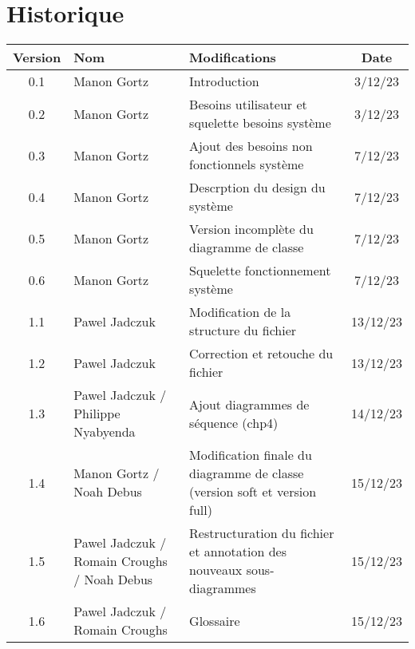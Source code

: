 \documentclass[../introduction.tex]{subfiles}
\begin{document}
\section{Historique}
\begin{tabular}{|c|p{4cm}|p{6cm}|c|}
    \hline  
    Version & Nom & Modifications & Date\\  
    \hline 
    0.1 & Manon Gortz & Introduction & 3/12/23 \\   
    0.2 & Manon Gortz & Besoins utilisateur et squelette besoins système & 3/12/23 \\ 
    0.3 & Manon Gortz & Ajout des besoins non fonctionnels système & 7/12/23 \\
    0.4 & Manon Gortz & Descrption du design du système & 7/12/23 \\
    0.5 & Manon Gortz & Version incomplète du diagramme de classe & 7/12/23 \\
    0.6 & Manon Gortz & Squelette fonctionnement système & 7/12/23 \\
    1.1 & Pawel Jadczuk & Modification de la structure du fichier & 13/12/23 \\
    1.2 & Pawel Jadczuk & Correction et retouche du fichier & 13/12/23 \\
    1.3 & Pawel Jadczuk / Philippe Nyabyenda & Ajout  diagrammes de séquence (chp4) & 14/12/23 \\
    1.4 & Manon Gortz / Noah Debus & Modification finale du diagramme de classe (version soft et version full) & 15/12/23 \\
    1.5 & Pawel Jadczuk / Romain Croughs / Noah Debus & Restructuration du fichier et annotation des nouveaux sous-diagrammes & 15/12/23 \\
    1.6 & Pawel Jadczuk / Romain Croughs & Glossaire & 15/12/23 \\
    \hline 
\end{tabular}
\end{document}
